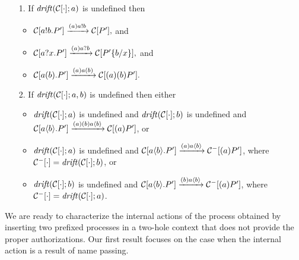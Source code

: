 \begin{lemma}
\label{lemm:contexts_undefined}
\leavevmode
  \begin{itemize}
    \item[1.] If $\mathit {drift}(\mathcal{C}[\cdot]; a)$ is undefined then
      \begin{itemize}
           \item
                $\mathcal{C}[a!b.P'] \xrightarrow{(a)a!b}\mathcal{C}[P'],$ and 
           \item
                 $\mathcal{C}[a?x.P'] \xrightarrow{(a)a?b}\mathcal{C}[P' \{b/x\}],$ and
           \item
                $\mathcal{C}[a(b).P'] \xrightarrow{(a) a(b)}\mathcal{C}[(a)(b)P'].$
       \end{itemize}
    \item[2.] If $\mathit {drift}(\mathcal{C}[\cdot]; a, b)$ is undefined then either
    	\begin{itemize}
    	\item $\mathit {drift}(\mathcal{C}[\cdot]; a)$ is undefined and $\mathit {drift}(\mathcal{C}[\cdot];  b)$ is undefined and\\
    	 $\mathcal{C}[a\langle b\rangle.P'] \xrightarrow{(a) (b) a\langle b\rangle}\mathcal{C}[(a)P']$, or 
    	\item $\mathit {drift}(\mathcal{C}[\cdot]; a)$ is undefined and $\mathcal{C}[a\langle b\rangle.P'] \xrightarrow{(a)  a\langle b\rangle}\mathcal{C}^-[(a)P']$, where\\ 
    	$\mathcal{C}^-[\cdot]=\mathit {drift}(\mathcal{C}[\cdot]; b)$, or 
    	\item $\mathit {drift}(\mathcal{C}[\cdot]; b)$ is undefined and $\mathcal{C}[a\langle b\rangle.P'] \xrightarrow{ (b) a\langle b\rangle}\mathcal{C}^-[(a)P']$, where\\  
    	$\mathcal{C}^-[\cdot]=\mathit {drift}(\mathcal{C}[\cdot]; a)$.
    	\end{itemize}
  \end{itemize}
\end{lemma}


We are ready to characterize the internal actions of the process obtained by inserting two prefixed processes in a two-hole context that does not provide the proper authorizations. Our first result focuses on the case when the internal action is a result of name passing.

